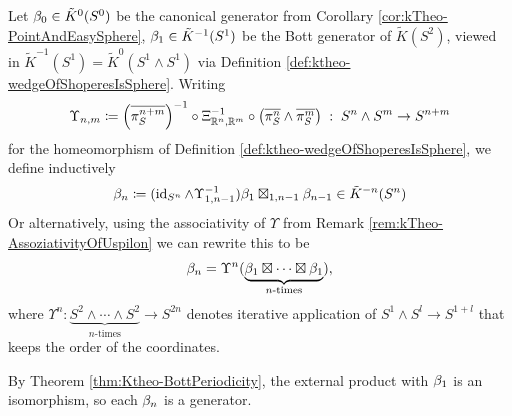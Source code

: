 \begin{definition}[Convention]\label{def:ktheo-higherBottGenerators}
    Let $\beta_0\in \tilde{K}^{0}(S^0)$ be the canonical generator from Corollary \ref{cor:kTheo-PointAndEasySphere},
    $\beta_1\in \tilde{K}^{-1}(S^1)$ be the Bott generator of $\tilde{K}(S^2)$,
    viewed in $\tilde{K}^{-1}(S^1)=\tilde{K}^{0}(S^1\wedge S^1)$ via Definition
    \ref{def:ktheo-wedgeOfShoperesIsSphere}. Writing
    \begin{equation*}
        \Upsilon_{n,m}\coloneq \left(\overline{\pi_S^{n+m}}\right)^{-1}\circ
        \Xi_{\mathbb{R}^n,\mathbb{R}^m}^{-1}\circ\left(\overline{\pi_S^{n}}\wedge\overline{\pi_S^{m}}\right)
        \;:\;S^n\wedge S^m\to S^{n+m}
    \end{equation*}
    for the homeomorphism of Definition \ref{def:ktheo-wedgeOfShoperesIsSphere},
    we define inductively
	\begin{equation*}
		\beta_n\coloneq (\operatorname{\mathrm{id}}_{S^n}\wedge \Upsilon^{-1}_{1,n-1})\beta_1\boxtimes_{1,n-1}\beta_{n-1}\in \tilde{K}^{-n}(S^n)
	\end{equation*}
 Or alternatively, using the associativity of $\Upsilon$ from Remark \ref{rem:kTheo-AssoziativityOfUspilon} we can rewrite this to be 
	\begin{equation*}
		\beta_n=\Upsilon^n(\underbrace{\beta_1\boxtimes \cdots \boxtimes \beta_1}_{n\text{-times}}),
	\end{equation*} where $\Upsilon^n:\underbrace{S^2\wedge \cdots \wedge S^2}_{n\text{-times}}\to S^{2n}$ denotes iterative application of $S^1\wedge S^l\to S^{1+l}$ that keeps the order of the coordinates.

    By Theorem \ref{thm:Ktheo-BottPeriodicity}, the external product
    with $\beta_1$ is an isomorphism, so each $\beta_n$ is a generator.
\end{definition}

